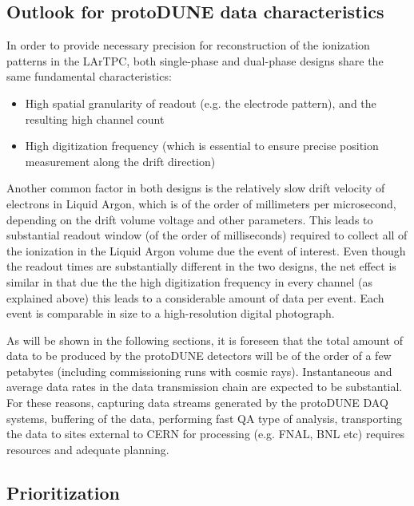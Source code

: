 \subsection{Outlook for protoDUNE data characteristics}

In order to provide necessary precision for reconstruction of the ionization patterns in the LArTPC, both single-phase and dual-phase designs share the same fundamental characteristics:
\begin{itemize}
\item High spatial granularity of readout (e.g. the electrode pattern), and the resulting high channel count
\item High digitization frequency (which is essential to ensure precise position measurement along the drift direction)
\end{itemize}

\noindent
Another common factor in both designs is the relatively slow drift velocity of electrons in Liquid Argon, which is of the order of millimeters per microsecond, depending on the drift volume voltage and other parameters. This leads to substantial readout window (of the order of milliseconds) required to collect all of the ionization in the Liquid Argon volume due the event of interest. Even though the readout times are substantially different in the two designs, the net effect is similar in that due the the high digitization frequency in every channel (as explained above) this leads to a considerable amount of data per event.  Each event is comparable in size to a high-resolution digital photograph.

As will be shown in the following sections, it is foreseen that the total amount of data to be produced by the protoDUNE detectors will be of the order of a few petabytes (including commissioning runs with cosmic rays). Instantaneous and average data rates in the data transmission chain are expected to be substantial. For these reasons, capturing data streams generated by the protoDUNE DAQ systems, buffering of the data, performing fast QA type of analysis, transporting the data to sites external to CERN for processing (e.g. FNAL, BNL etc) requires resources and adequate planning.

\subsection{Prioritization}

